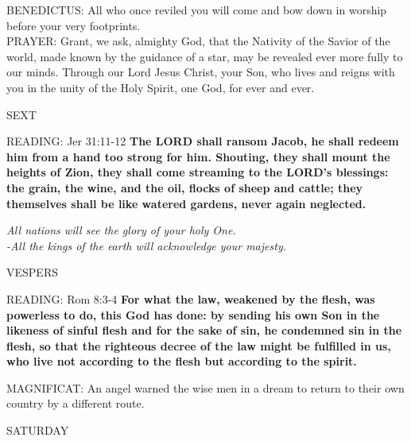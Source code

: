 \noindent\small{\uppercase{BENEDICTUS:}}	All who once reviled you will come and bow down in worship before your very footprints.\\

\noindent\small{\uppercase{PRAYER:}}	Grant, we ask, almighty God, that the Nativity of the Savior of the world, made known by the guidance of a star, may be revealed ever more fully to our minds. Through our Lord Jesus Christ, your Son, who lives and reigns with you in the unity of the Holy Spirit, one God, for ever and ever.

\begin{flushleft}\normalsize{\uppercase{SEXT\\}}\end{flushleft}
\noindent\small{\uppercase{READING:}}   Jer 31:11-12 \textbf{  The LORD shall ransom Jacob, he shall redeem him from a hand too strong for him. Shouting, they shall mount the heights of Zion, they shall come streaming to the LORD’s blessings: the grain, the wine, and the oil, flocks of sheep and cattle; they themselves shall be like watered gardens, never again neglected.}
\begin{center}\textit{All nations will see the glory of your holy One.\\
-All the kings of the earth will acknowledge your majesty.}\end{center}

\begin{flushleft}\normalsize{\uppercase{VESPERS\\}}\end{flushleft}
\noindent\small{\uppercase{READING:}}   Rom 8:3-4 \textbf{  For what the law, weakened by the flesh, was powerless to do, this God has done: by sending his own Son in the likeness of sinful flesh and for the sake of sin, he condemned sin in the flesh, so that the righteous decree of the law might be fulfilled in us, who live not according to the flesh but according to the spirit.\\}

\noindent\small{\uppercase{MAGNIFICAT:}}	An angel warned the wise men in a dream to return to their own country by a different route.\\

\begin{center}
\normalsize SATURDAY
\end{center}

